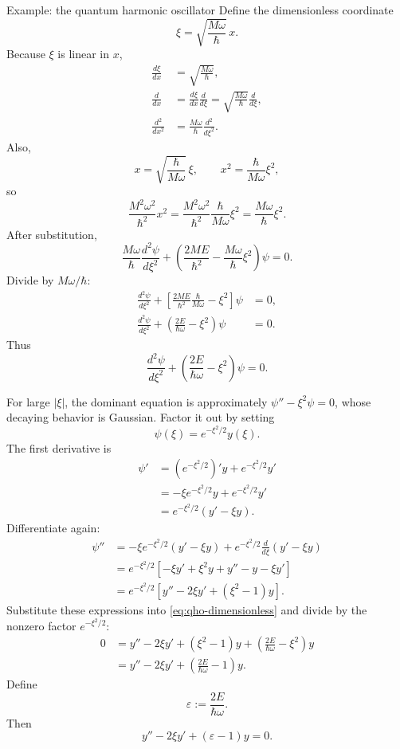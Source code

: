 \documentclass[11pt]{beamer}
\begin{document}
\begin{frame}[allowframebreaks]{Example: the quantum harmonic oscillator}
Define the dimensionless coordinate
\[
  \xi=\sqrt{\frac{M\omega}{\hbar}}\,x.
\]
Because $\xi$ is linear in $x$,
\begin{align*}
  \frac{d\xi}{dx}
    &=\sqrt{\frac{M\omega}{\hbar}},\\
  \frac{d}{dx}
    &=\frac{d\xi}{dx}\frac{d}{d\xi}
      =\sqrt{\frac{M\omega}{\hbar}}\frac{d}{d\xi},\\
  \frac{d^2}{dx^2}
    &=\frac{M\omega}{\hbar}\frac{d^2}{d\xi^2}.
\end{align*}
Also,
\[
  x=\sqrt{\frac{\hbar}{M\omega}}\,\xi,
  \qquad
  x^2=\frac{\hbar}{M\omega}\xi^2,
\]
so
\[
  \frac{M^2\omega^2}{\hbar^2}x^2
   =
  \frac{M^2\omega^2}{\hbar^2}
  \frac{\hbar}{M\omega}\xi^2
   =
  \frac{M\omega}{\hbar}\xi^2.
\]
After substitution,
\[
  \frac{M\omega}{\hbar}\frac{d^2\psi}{d\xi^2}
  +\left(
    \frac{2ME}{\hbar^2}
    -\frac{M\omega}{\hbar}\xi^2
  \right)\psi=0.
\]
Divide by $M\omega/\hbar$:
\begin{align*}
  \frac{d^2\psi}{d\xi^2}
  +\left[
    \frac{2ME}{\hbar^2}\frac{\hbar}{M\omega}
    -\xi^2
  \right]\psi
  &=0,\\
  \frac{d^2\psi}{d\xi^2}
  +\left(
    \frac{2E}{\hbar\omega}-\xi^2
  \right)\psi
  &=0.
\end{align*}
Thus
\begin{equation}
  \frac{d^2\psi}{d\xi^2}
  +\left(\frac{2E}{\hbar\omega}-\xi^2\right)\psi=0.
  \label{eq:qho-dimensionless}
\end{equation}

For large $|\xi|$, the dominant equation is approximately
$\psi''-\xi^2\psi=0$, whose decaying behavior is Gaussian.  Factor it out by
setting
\[
  \psi(\xi)=e^{-\xi^2/2}y(\xi).
\]
The first derivative is
\begin{align*}
  \psi'
   &=
    \left(e^{-\xi^2/2}\right)'y
    +e^{-\xi^2/2}y'\\
   &=
    -\xi e^{-\xi^2/2}y
    +e^{-\xi^2/2}y'\\
   &=
    e^{-\xi^2/2}(y'-\xi y).
\end{align*}
Differentiate again:
\begin{align*}
  \psi''
   &=
    -\xi e^{-\xi^2/2}(y'-\xi y)
    +e^{-\xi^2/2}\frac{d}{d\xi}(y'-\xi y)\\
   &=
    e^{-\xi^2/2}
    \left[
      -\xi y'+\xi^2y+y''-y-\xi y'
    \right]\\
   &=
    e^{-\xi^2/2}
    \left[
      y''-2\xi y'+(\xi^2-1)y
    \right].
\end{align*}
Substitute these expressions into \eqref{eq:qho-dimensionless} and divide by
the nonzero factor $e^{-\xi^2/2}$:
\begin{align*}
  0
   &=
    y''-2\xi y'+(\xi^2-1)y
    +\left(\frac{2E}{\hbar\omega}-\xi^2\right)y\\
   &=
    y''-2\xi y'
    +\left(\frac{2E}{\hbar\omega}-1\right)y.
\end{align*}
Define
\[
  \varepsilon:=\frac{2E}{\hbar\omega}.
\]
Then
\begin{equation}
  y''-2\xi y'+(\varepsilon-1)y=0.
  \label{eq:qho-hermite-reduction}
\end{equation}


\end{frame}
\end{document}
